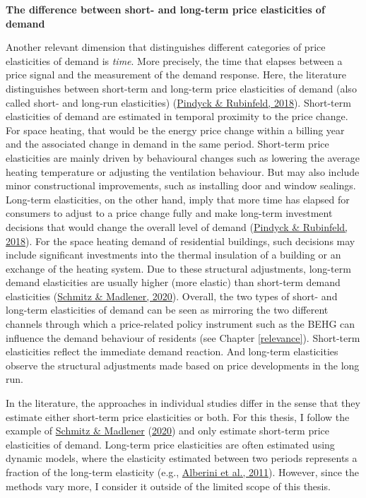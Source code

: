 \documentclass[12pt,twoside]{reedthesis}
\begin{document}
\textbf{The difference between short- and long-term price elasticities of demand}

Another relevant dimension that distinguishes different categories of price elasticities of demand is \emph{time}. More precisely, the time that elapses between a price signal and the measurement of the demand response. Here, the literature distinguishes between short-term and long-term price elasticities of demand (also called short- and long-run elasticities) (\protect\hyperlink{ref-pindyck_rubinfeld18}{Pindyck \& Rubinfeld, 2018}). Short-term elasticities of demand are estimated in temporal proximity to the price change. For space heating, that would be the energy price change within a billing year and the associated change in demand in the same period. Short-term price elasticities are mainly driven by behavioural changes such as lowering the average heating temperature or adjusting the ventilation behaviour. But may also include minor constructional improvements, such as installing door and window sealings. Long-term elasticities, on the other hand, imply that more time has elapsed for consumers to adjust to a price change fully and make long-term investment decisions that would change the overall level of demand (\protect\hyperlink{ref-pindyck_rubinfeld18}{Pindyck \& Rubinfeld, 2018}). For the space heating demand of residential buildings, such decisions may include significant investments into the thermal insulation of a building or an exchange of the heating system. Due to these structural adjustments, long-term demand elasticities are usually higher (more elastic) than short-term demand elasticities (\protect\hyperlink{ref-schmitz_madlener20}{Schmitz \& Madlener, 2020}). Overall, the two types of short- and long-term elasticities of demand can be seen as mirroring the two different channels through which a price-related policy instrument such as the BEHG can influence the demand behaviour of residents (see Chapter \ref{relevance}). Short-term elasticities reflect the immediate demand reaction. And long-term elasticities observe the structural adjustments made based on price developments in the long run.

In the literature, the approaches in individual studies differ in the sense that they estimate either short-term price elasticities or both. For this thesis, I follow the example of \protect\hyperlink{ref-schmitz_madlener20}{Schmitz \& Madlener} (\protect\hyperlink{ref-schmitz_madlener20}{2020}) and only estimate short-term price elasticities of demand. Long-term price elasticities are often estimated using dynamic models, where the elasticity estimated between two periods represents a fraction of the long-term elasticity (e.g., \protect\hyperlink{ref-alberini_etal11}{Alberini et al., 2011}). However, since the methods vary more, I consider it outside of the limited scope of this thesis.
\end{document}
